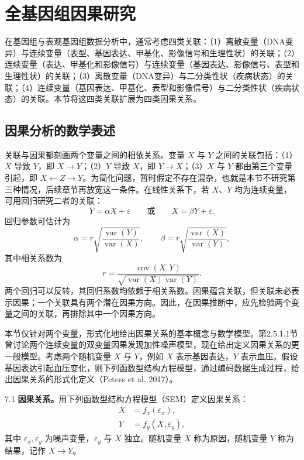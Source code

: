 \section{全基因组因果研究}
在基因组与表观基因组数据分析中，通常考虑四类关联：（1）离散变量（DNA变异）与连续变量（表型、基因表达、甲基化、影像信号和生理性状）的关联；（2）连续变量（表达、甲基化和影像信号）与连续变量（基因表达、影像信号、表型和生理性状）的关联；（3）离散变量（DNA变异）与二分类性状（疾病状态）的关联；（4）连续变量（基因表达、甲基化、表型和影像信号）与二分类性状（疾病状态）的关联。本节将这四类关联扩展为四类因果关系。

\subsection{因果分析的数学表述}
关联与因果都刻画两个变量之间的相依关系。变量 $X$ 与 $Y$ 之间的关联包括：（1）$X$ 导致 $Y$，即 $X\to Y$；（2）$Y$ 导致 $X$，即 $Y\to X$；（3）$X$ 与 $Y$ 都由第三个变量引起，即 $X\leftarrow Z\to Y$。为简化问题，暂时假定不存在混杂，也就是本节不研究第三种情况，后续章节再放宽这一条件。在线性关系下，若 $X$、$Y$ 均为连续变量，可用回归研究二者的关联：
\[
Y=\alpha X+\varepsilon\qquad\text{或}\qquad X=\beta Y+\varepsilon.
\]
回归参数可估计为
\[
\alpha=r\sqrt{\frac{\operatorname{var}(Y)}{\operatorname{var}(X)}},\qquad
\beta=r\sqrt{\frac{\operatorname{var}(X)}{\operatorname{var}(Y)}},
\]
其中相关系数为
\[
r=\frac{\operatorname{cov}(X,Y)}{\sqrt{\operatorname{var}(X)\operatorname{var}(Y)}}.
\]
两个回归可以反转，其回归系数均依赖于相关系数。因果蕴含关联，但关联未必表示因果；一个关联具有两个潜在因果方向。因此，在因果推断中，应先检验两个变量之间的关联，再排除其中一个因果方向。

本节仅针对两个变量，形式化地给出因果关系的基本概念与数学模型。第2.5.1.1节曾讨论两个连续变量的双变量因果发现加性噪声模型，现在给出定义因果关系的更一般模型。考虑两个随机变量 $X$ 与 $Y$，例如 $X$ 表示基因表达，$Y$ 表示血压。假设基因表达引起血压变化，则下列函数型结构方程模型，通过编码数据生成过程，给出因果关系的形式化定义（Peters et al. 2017）。

\begin{bookdefinition}{7.1}
\textbf{因果关系。}用下列函数型结构方程模型（SEM）定义因果关系：
\begin{equation}
\begin{aligned}
X&=f_x(\varepsilon_x),\\
Y&=f_y(X,\varepsilon_y),
\end{aligned}
\tag{7.1}
\end{equation}
其中 $\varepsilon_x,\varepsilon_y$ 为噪声变量，$\varepsilon_y$ 与 $X$ 独立。随机变量 $X$ 称为原因，随机变量 $Y$ 称为结果，记作 $X\to Y$。
\end{bookdefinition}

